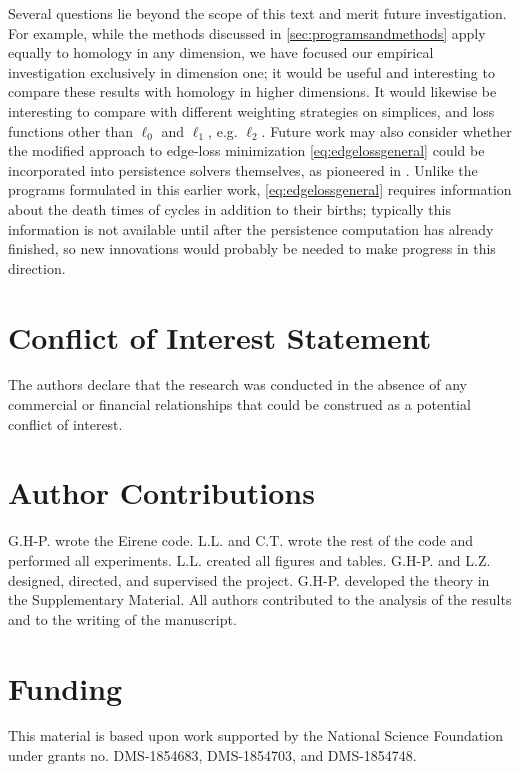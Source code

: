 \begin{enumerate}
 Several questions lie beyond the scope of this text and merit future investigation.  For example, while the methods discussed in \se \ref{sec:programsandmethods} apply equally to homology in any dimension, we have focused our empirical investigation exclusively in dimension one; it would be useful and interesting to compare these results with homology in higher dimensions.  It would likewise be interesting to compare with different weighting strategies on simplices, and loss functions other than $\ell_0$ and $\ell_1$, e.g. $\ell_2$.  Future work may also consider whether the modified approach to edge-loss minimization \pr \eqref{eq:edgelossgeneral} could be incorporated into persistence solvers themselves, as pioneered in \cite{Escolar2016}.  Unlike the programs formulated in this earlier work, \pr \eqref{eq:edgelossgeneral} requires information about the death times of cycles in addition to their births; typically this information is not available until after the persistence computation has already finished, so new innovations would probably be needed to make progress in this direction.   
    


\end{enumerate}

 





\section{Conflict of Interest Statement} 
The authors declare that the research was conducted in the absence of any commercial or financial relationships that could be construed as a potential conflict of interest.

\section{Author Contributions}

G.H-P. wrote the Eirene code. L.L. and C.T. wrote the rest of the code and performed all experiments. L.L. created all figures and tables. G.H-P. and L.Z. designed, directed, and supervised the project. G.H-P. developed the theory in the Supplementary Material. All authors contributed to the analysis of the results and to the writing of the manuscript.

\section{Funding}
This material is based upon work supported by the National Science Foundation under grants no. DMS-1854683, DMS-1854703, and DMS-1854748. 

